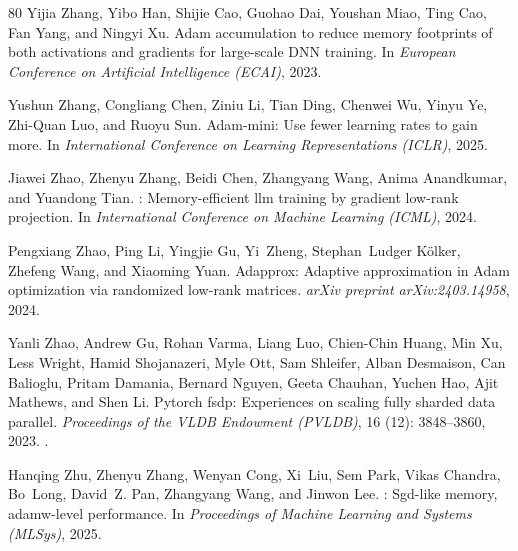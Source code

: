 \documentclass[10pt,twocolumn,letterpaper]{article}
\theoremstyle{plain}
\theoremstyle{definition}
\theoremstyle{remark}
\begin{document}
{\begin{thebibliography}{80}
Yijia Zhang, Yibo Han, Shijie Cao, Guohao Dai, Youshan Miao, Ting Cao, Fan
  Yang, and Ningyi Xu.
\newblock Adam accumulation to reduce memory footprints of both activations and
  gradients for large-scale {DNN} training.
\newblock In \emph{European Conference on Artificial Intelligence (ECAI)},
  2023.

Yushun Zhang, Congliang Chen, Ziniu Li, Tian Ding, Chenwei Wu, Yinyu Ye,
  Zhi-Quan Luo, and Ruoyu Sun.
\newblock Adam-mini: Use fewer learning rates to gain more.
\newblock In \emph{International Conference on Learning Representations
  (ICLR)}, 2025.

Jiawei Zhao, Zhenyu Zhang, Beidi Chen, Zhangyang Wang, Anima Anandkumar, and
  Yuandong Tian.
: Memory-efficient llm training by gradient low-rank
  projection.
\newblock In \emph{International Conference on Machine Learning (ICML)},
  2024{}.

Pengxiang Zhao, Ping Li, Yingjie Gu, Yi~Zheng, Stephan~Ludger K{\"o}lker,
  Zhefeng Wang, and Xiaoming Yuan.
\newblock Adapprox: Adaptive approximation in {A}dam optimization via
  randomized low-rank matrices.
\newblock \emph{arXiv preprint arXiv:2403.14958}, 2024{}.

Yanli Zhao, Andrew Gu, Rohan Varma, Liang Luo, Chien-Chin Huang, Min Xu, Less
  Wright, Hamid Shojanazeri, Myle Ott, Sam Shleifer, Alban Desmaison, Can
  Balioglu, Pritam Damania, Bernard Nguyen, Geeta Chauhan, Yuchen Hao, Ajit
  Mathews, and Shen Li.
\newblock Pytorch fsdp: Experiences on scaling fully sharded data parallel.
\newblock \emph{Proceedings of the VLDB Endowment (PVLDB)}, 16
  (12): 3848--3860, 2023.
\newblock {}.

Hanqing Zhu, Zhenyu Zhang, Wenyan Cong, Xi~Liu, Sem Park, Vikas Chandra,
  Bo~Long, David~Z. Pan, Zhangyang Wang, and Jinwon Lee.
: Sgd-like memory, adamw-level performance.
\newblock In \emph{Proceedings of Machine Learning and Systems (MLSys)}, 2025.

\end{thebibliography}
}
\end{document}

